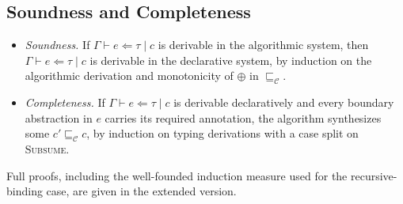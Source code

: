\subsection{Soundness and Completeness}

\begin{itemize}
  \item \emph{Soundness.} If $\Gamma \vdash e \Leftarrow \tau \mid c$ is
    derivable in the algorithmic system, then $\Gamma \vdash e \Leftarrow
    \tau \mid c$ is derivable in the declarative system, by induction on
    the algorithmic derivation and monotonicity of $\oplus$ in
    $\sqsubseteq_{\mathcal{C}}$.
  \item \emph{Completeness.} If $\Gamma \vdash e \Leftarrow \tau \mid c$
    is derivable declaratively and every boundary abstraction in $e$
    carries its required annotation, the algorithm synthesizes some
    $c' \sqsubseteq_{\mathcal{C}} c$, by induction on typing derivations
    with a case split on \textsc{Subsume}.
\end{itemize}

Full proofs, including the well-founded induction measure used for the
recursive-binding case, are given in the extended version.
